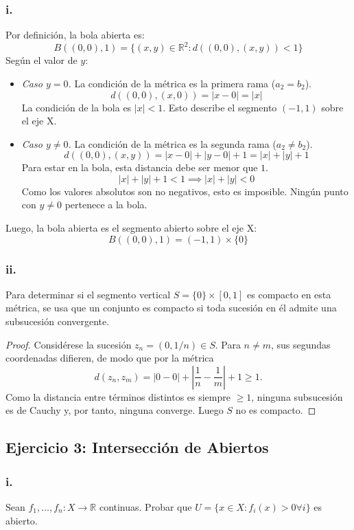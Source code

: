 \documentclass[11pt, a4paper]{article}
\begin{document}
\subsubsection*{i.}
Por definición, la bola abierta es:
$$ B((0,0), 1) = \{ (x,y) \in \mathbb{R}^2 : d((0,0), (x,y)) < 1 \} $$
Según el valor de $y$:

\begin{itemize}
    \item \textit{Caso $y = 0$.}
    La condición de la métrica es la primera rama ($a_2 = b_2$).
    $$ d((0,0), (x,0)) = |x - 0| = |x| $$
    La condición de la bola es $|x| < 1$.
    Esto describe el segmento $(-1, 1)$ sobre el eje X.

    \item \textit{Caso $y \neq 0$.}
    La condición de la métrica es la segunda rama ($a_2 \neq b_2$).
    $$ d((0,0), (x,y)) = |x - 0| + |y - 0| + 1 = |x| + |y| + 1 $$
    Para estar en la bola, esta distancia debe ser menor que $1$.
    $$ |x| + |y| + 1 < 1 \implies |x| + |y| < 0 $$
    Como los valores absolutos son no negativos, esto es imposible.
    Ningún punto con $y \neq 0$ pertenece a la bola.
\end{itemize}

Luego, la bola abierta es el segmento abierto sobre el eje X:
$$ B((0,0), 1) = (-1, 1) \times \{0\} $$

\subsubsection*{ii.}
Para determinar si el segmento vertical $S = \{0\} \times [0,1]$ es compacto en esta métrica, se usa
que un conjunto es compacto si toda sucesión en él admite una subsucesión convergente.

\begin{proof}
Considérese la sucesión $z_n = (0, 1/n) \in S$. Para $n \neq m$, sus segundas coordenadas difieren,
de modo que por la métrica
$$ d(z_n, z_m) = |0 - 0| + \left| \frac{1}{n} - \frac{1}{m} \right| + 1 \ge 1. $$
Como la distancia entre términos distintos es siempre $\ge 1$, ninguna subsucesión es de Cauchy y,
por tanto, ninguna converge. Luego $S$ no es compacto.
\end{proof}

\subsection*{Ejercicio 3: Intersección de Abiertos}

\subsubsection*{i.}
Sean $f_1, \dots, f_n : X \to \mathbb{R}$ continuas. Probar que
$U = \{ x \in X : f_i(x) > 0 \forall i \}$ es abierto.
\end{document}
